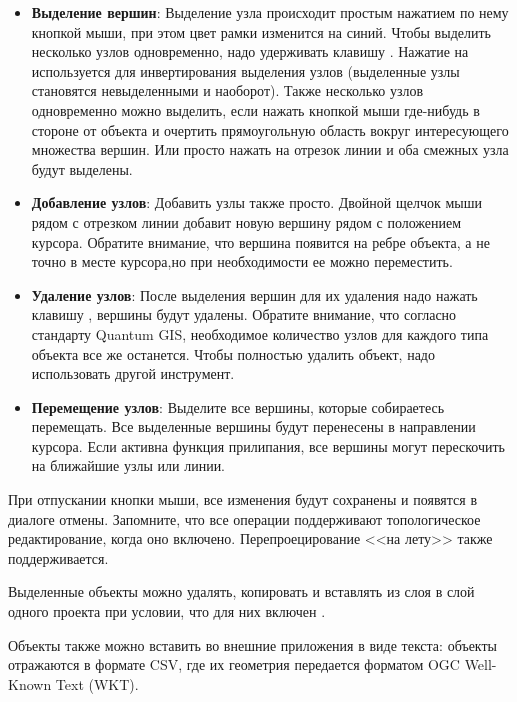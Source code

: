 \begin{itemize}[label=--]
\item \textbf{Выделение вершин}: Выделение узла происходит простым нажатием
по нему кнопкой мыши, при этом цвет рамки изменится на синий. Чтобы выделить
несколько узлов одновременно, надо удерживать клавишу
. Нажатие на
 используется для инвертирования выделения узлов (выделенные
узлы становятся невыделенными и наоборот). Также несколько узлов одновременно
можно выделить, если нажать кнопкой мыши где-нибудь в стороне от объекта и
очертить прямоугольную область вокруг интересующего множества вершин. Или
просто нажать на отрезок линии и оба смежных узла будут выделены.
\item \textbf{Добавление узлов}: Добавить узлы также просто. Двойной щелчок
мыши рядом с отрезком линии добавит новую вершину рядом с положением курсора.
Обратите внимание, что вершина появится на ребре объекта, а не точно в
месте курсора,но при необходимости ее можно переместить.
\item \textbf{Удаление узлов}: После выделения вершин для их удаления надо
нажать клавишу , вершины будут удалены. Обратите внимание,
что согласно стандарту Quantum GIS, необходимое количество узлов для каждого
типа объекта все же останется. Чтобы полностью удалить объект, надо использовать
другой инструмент.
\item \textbf{Перемещение узлов}: Выделите все вершины, которые собираетесь
перемещать. Все выделенные вершины будут перенесены в направлении курсора.
Если активна функция прилипания, все вершины могут перескочить на
ближайшие узлы или линии.
\end{itemize}

При отпускании кнопки мыши, все изменения будут сохранены и появятся в
диалоге отмены. Запомните, что все операции поддерживают топологическое
редактирование, когда оно включено. Перепроецирование <<на лету>> также
поддерживается.


Выделенные объекты можно удалять, копировать и вставлять из слоя в слой
одного проекта \qg  при условии, что для них включен
.

Объекты также можно вставить во внешние приложения в виде текста: объекты
отражаются в формате  CSV, где их геометрия передается форматом
OGC Well-Known Text (WKT).


